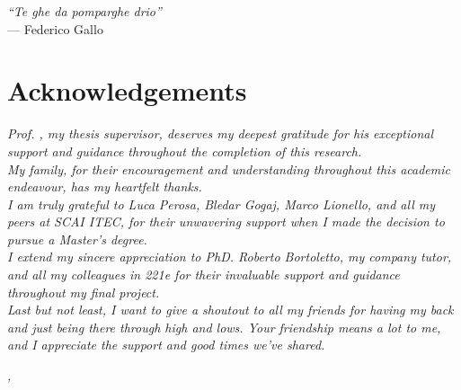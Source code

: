 \cleardoublepage
{}
{}

\begin{flushright}{
    \slshape
    ``Te ghe da pomparghe drio''} \\
    \medskip
    --- Federico Gallo
\end{flushright}


\bigskip

\begingroup
\let\clearpage\relax
\let\cleardoublepage\relax
\let\cleardoublepage\relax

\chapter*{Acknowledgements}

\noindent \textit{Prof. \myProf, my thesis supervisor, deserves my deepest gratitude for his exceptional support and guidance throughout the completion of this research.}\\
\noindent \textit{My family, for their encouragement and understanding throughout this academic endeavour, has my heartfelt thanks.}\\
\noindent \textit{I am truly grateful to Luca Perosa, Bledar Gogaj, Marco Lionello, and all my peers at SCAI ITEC, for their unwavering support when I made the decision to pursue a Master’s degree.}\\
\noindent \textit{I extend my sincere appreciation to PhD. Roberto Bortoletto, my company tutor, and all my colleagues in 221e for their invaluable support and guidance throughout my final project.}\\
\noindent \textit{Last but not least, I want to give a shoutout to all my friends for having my back and just being there through high and lows. Your friendship means a lot to me, and I appreciate the support and good times we've shared.}\\
\bigskip

\noindent\textit{\myLocation, \myTime}
\hfill \myName

\endgroup
